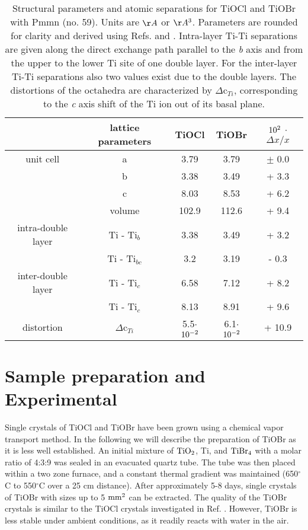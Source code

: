 \documentclass[prb,preprint,draft,amsmath,showpacs]{revtex4}
\begin{document}
\begin{table}[h!]
\caption{Structural parameters and atomic separations for TiOCl and TiOBr with Pmmn (no.
59). Units are $\AA$ or $\AA^3$. Parameters are rounded for clarity and derived using
Refs.  and . Intra-layer Ti-Ti separations
are given along the direct exchange path parallel to the \emph{b} axis and from the
upper to the lower Ti site of one double layer. For the inter-layer Ti-Ti separations
also two values exist due to the double layers. The distortions of the octahedra are
characterized by $\Delta$c$_{Ti}$, corresponding to the \emph{c} axis shift of the Ti
ion out of its basal plane.} \label{table1}\vspace{0.5cm} \centering
\begin{tabular}{|c|c|c|c|c|}
  \hline
  & lattice parameters & TiOCl & TiOBr & $\rm 10^2$ $\cdot$ $\Delta x/x$\\
  \hline\hline
  unit cell   & a         & 3.79  & 3.79  & $\pm$ 0.0   \\
              & b         & 3.38  & 3.49  & + 3.3 \\
              & c         & 8.03  & 8.53  & + 6.2 \\
  \hline
              & volume    & 102.9 & 112.6 & + 9.4 \\
  \hline\hline
  intra-double layer & Ti - Ti$_b$      & 3.38 & 3.49 & + 3.2 \\
              & Ti - Ti$_{bc}$   & 3.2  & 3.19 & - 0.3 \\
  \hline\hline
  inter-double layer & Ti - Ti$_c$      & 6.58 & 7.12 & + 8.2 \\
              & Ti - Ti$_c$      & 8.13 & 8.91 & + 9.6 \\
  \hline
  distortion  &  $\Delta$c$_{Ti}$& 5.5$\cdot$$\rm 10^{-2}$ & 6.1$\cdot$$\rm 10^{-2}$ & + 10.9 \\
  \hline
\end{tabular}
\end{table}


\section{Sample preparation and Experimental}

Single crystals of TiOCl and TiOBr have been grown using a chemical vapor transport
method.\cite{seidel03} In the following we will describe the preparation of TiOBr as it
is less well established. An initial mixture of $\rm TiO_2$, Ti, and $\rm TiBr_4$ with a
molar ratio of 4:3:9 was sealed in an evacuated quartz tube. The tube was then placed
within a two zone furnace, and a constant thermal gradient was maintained
(650$^{\circ}$C to 550$^{\circ}$C over a 25 cm distance). After approximately 5-8 days,
single crystals of TiOBr with sizes up to 5 $\rm mm^2$ can be extracted. The quality of
the TiOBr crystals is similar to the TiOCl crystals investigated in Ref.
\cite{seidel03}. However, TiOBr is less stable under ambient conditions, as it readily
reacts with water in the air.
\end{document}
